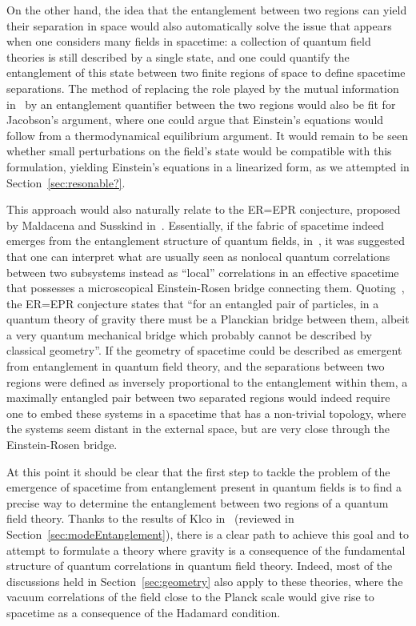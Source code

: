 \documentclass[letterpaper,12pt,titlepage,oneside,final]{book}
\begin{document}
On the other hand, the idea that the entanglement between two regions can yield their separation in space would also automatically solve the issue that appears when one considers many fields in spacetime: a collection of quantum field theories is still described by a single state, and one could quantify the entanglement of this state between two finite regions of space to define spacetime separations. The method of replacing the role played by the mutual information in~\cite{Cao2} by an entanglement quantifier between the two regions would also be fit for Jacobson's argument, where one could argue that Einstein's equations would follow from a thermodynamical equilibrium argument. It would remain to be seen whether small perturbations on the field's state would be compatible with this formulation, yielding Einstein's equations in a linearized form, as we attempted in Section~\ref{sec:resonable?}.


This approach would also naturally relate to the ER=EPR conjecture, proposed by Maldacena and Susskind in~\cite{MaldacenaSusskind}. Essentially, if the fabric of spacetime indeed emerges from the entanglement structure of quantum fields, in~\cite{MaldacenaSusskind}, it was suggested that one can interpret what are usually seen as nonlocal quantum correlations between two subsystems instead as ``local'' correlations in an effective spacetime that possesses a microscopical Einstein-Rosen bridge connecting them. Quoting~\cite{MaldacenaSusskind}, the ER=EPR conjecture states that ``for an entangled pair of particles, in a quantum theory of gravity there must be a Planckian bridge between them, albeit a very quantum mechanical bridge which probably cannot be described by classical geometry''. If the geometry of spacetime could be described as emergent from entanglement in quantum field theory, and the separations between two regions were defined as inversely proportional to the entanglement within them, a maximally entangled pair between two separated regions would indeed require one to embed these systems in a spacetime that has a non-trivial topology, where the systems seem distant in the external space, but are very close through the Einstein-Rosen bridge.

At this point it should be clear that the first step to tackle the problem of the emergence of spacetime from entanglement present in quantum fields is to find a precise way to determine the entanglement between two regions of a quantum field theory. Thanks to the results of Klco in~\cite{KlcoUVIR,KlcoEntStrQFTI,KlcoEntStrQFTII} (reviewed in Section~\ref{sec:modeEntanglement}), there is a clear path to achieve this goal and to attempt to formulate a theory where gravity is a consequence of the fundamental structure of quantum correlations in quantum field theory. Indeed, most of the discussions held in Section~\ref{sec:geometry} also apply to these theories, where the vacuum correlations of the field close to the Planck scale would give rise to spacetime as a consequence of the Hadamard condition. 
\end{document}
